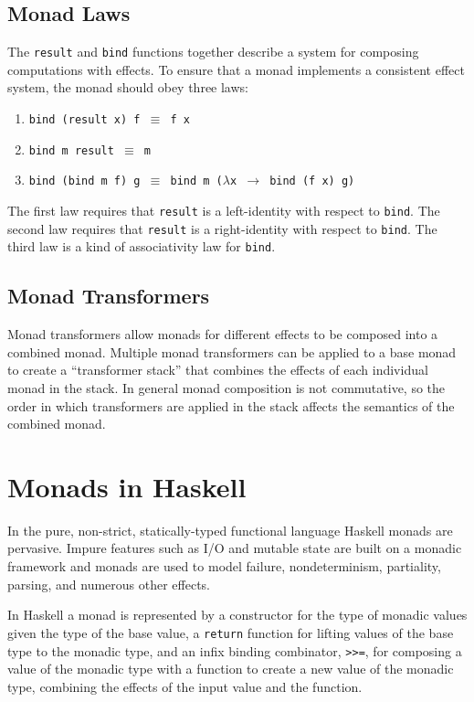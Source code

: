 \documentclass[natbib,10pt]{sigplanconf}
\begin{document}
\subsection{Monad Laws}

The {\tt result} and {\tt bind} functions together describe a system
for composing computations with effects.  To ensure that a monad
implements a consistent effect system, the monad should obey three laws:

\begin{enumerate}
\item {\tt bind (result x) f $\equiv$ f x}
\item {\tt bind m result $\equiv$ m}
\item {\tt bind (bind m f) g $\equiv$ bind m ($\lambda$x $\rightarrow$ bind (f x) g)}
\end{enumerate}

The first law requires that {\tt result} is a left-identity with
respect to {\tt bind}. The second law requires that {\tt result} is a
right-identity with respect to {\tt bind}. The third law is a kind of
associativity law for {\tt bind}.

\subsection{Monad Transformers}

Monad transformers allow monads for different effects to be composed
into a combined monad.  Multiple monad transformers can be applied to
a base monad to create a ``transformer stack'' that combines the
effects of each individual monad in the stack.  In general monad
composition is not commutative, so the order in which transformers are
applied in the stack affects the semantics of the combined monad.

\section{Monads in Haskell}

In the pure, non-strict, statically-typed functional language Haskell
monads are pervasive.  Impure features such as I/O and mutable state
are built on a monadic framework and monads are used to model failure,
nondeterminism, partiality, parsing, and numerous other effects. 

In Haskell a monad is represented by a constructor for the type of
monadic values given the type of the base value, a {\tt return}
function for lifting values of the base type to the monadic type, and
an infix binding combinator, {\tt >>=}, for composing a value of the
monadic type with a function to create a new value of the monadic
type, combining the effects of the input value and the function.
\end{document}
